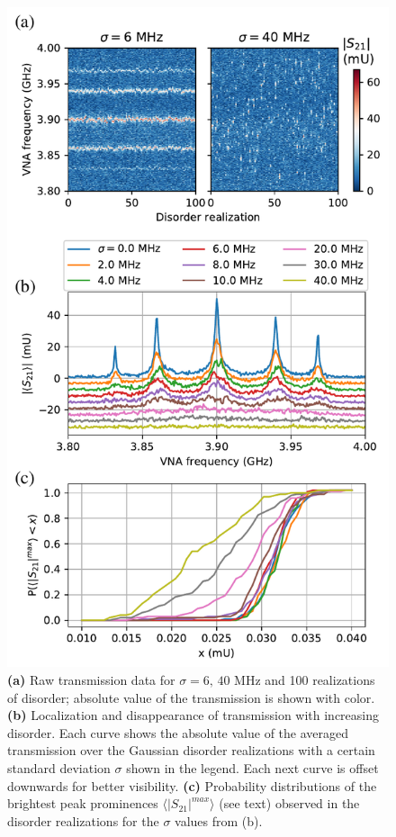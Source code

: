 \documentclass[%
 aps, pra,
 amsmath,amssymb,
 reprint,%
superscriptaddress
]{revtex4-2}
\begin{document}
\begin{figure}
	\includegraphics[width=1\linewidth]{Pictures/mbl}
	\caption{\textbf{(a)} Raw transmission data for $\sigma = 6,\, 40$ MHz and 100 realizations of disorder; absolute value of the transmission is shown with color. \textbf{(b)} Localization and disappearance of transmission with increasing disorder. Each curve shows the absolute value of the averaged transmission over the Gaussian disorder realizations with a certain standard deviation $\sigma$ shown in the legend. Each next curve is offset downwards for better visibility. \textbf{(c)} Probability distributions of the brightest peak prominences $\langle |S_{21}|^{max}\rangle$ (see text) observed in the disorder realizations for the $\sigma$ values from (b).}
	\label{fig:mbl}
\end{figure}
\end{document}

